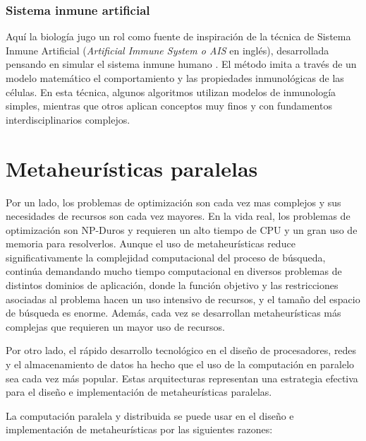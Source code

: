 \subsubsection{Sistema inmune artificial}

Aquí la biología jugo un rol como fuente de inspiración de la técnica de Sistema Inmune Artificial (\textit{Artificial Immune System o AIS} en inglés), desarrollada pensando en simular el sistema inmune humano \cite{CastroTimmis}. El método imita a través de un modelo matemático el comportamiento y las propiedades inmunológicas de las células. En esta técnica, algunos algoritmos utilizan modelos de inmunología simples, mientras que otros aplican conceptos muy finos y con fundamentos interdisciplinarios complejos.


\section{Metaheurísticas paralelas}
Por un lado, los problemas de optimización son cada vez mas complejos y sus necesidades de recursos son cada vez mayores. En la vida real, los problemas de optimización son NP-Duros y requieren un alto tiempo de CPU y un gran uso de memoria para resolverlos. Aunque el uso de metaheurísticas reduce significativamente la complejidad computacional del proceso de búsqueda, continúa demandando mucho tiempo computacional en diversos problemas de distintos dominios de aplicación, donde la función objetivo y las restricciones asociadas al problema hacen un uso intensivo de recursos, y el tamaño del espacio de búsqueda es enorme. Además, cada vez se desarrollan metaheurísticas más complejas que requieren un mayor uso de recursos.


Por otro lado, el rápido desarrollo tecnológico en el diseño de procesadores, redes y el almacenamiento de datos ha hecho que el uso de la computación en paralelo sea cada vez más popular. Estas arquitecturas representan una estrategia efectiva para el diseño e implementación de metaheurísticas paralelas. 


La computación paralela y distribuida se puede usar en el diseño e implementación de metaheurísticas por las siguientes razones:

